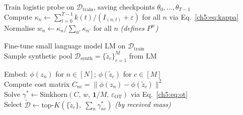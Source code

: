 \begin{algorithm}[ht]

    \caption{Trajectory-Aware Knowledge Estimation (\textbf{TAKE})}
    \label{ch5:alg:take}


    \vspace{-0.5\baselineskip}
    \Comment{\noindent\hrulefill}

    \vspace{0.5\baselineskip}
    Train logistic probe on $\mathcal{D}_\text{train}$, saving checkpoints $\theta_0, \ldots, \theta_{T-1}$ \\
    Compute $\kappa_n \leftarrow \textstyle\sum_{t=0}^{T-1} k(t) / (I_{(n,t)} + \varepsilon)$ for all $n$ \hfill via Eq.~\eqref{ch5:eq:kappa} \\
    Normalise $w_n \leftarrow \kappa_n / \sum_{n'} \kappa_{n'}$ for all $n$ \hfill\textit{(defines $P^w$)}

    \vspace{0.5\baselineskip}
    Fine-tune small language model $\mathrm{LM}$ on $\mathcal{D}_\text{train}$ \\
    Sample synthetic pool $\mathcal{D}_\text{synth} = \{\tilde{z}_c\}_{c=1}^{M}$ from $\mathrm{LM}$

    \vspace{0.5\baselineskip}
    Embed: $\phi(z_n)$ for $n \in [N]$; $\phi(\tilde{z}_c)$ for $c \in [M]$ \\
    Compute cost matrix $C_{nc} = \|\phi(z_n) - \phi(\tilde{z}_c)\|^2$ \\
    Solve $\gamma^* \leftarrow \mathrm{Sinkhorn}(C,\, w,\, \mathbf{1}/M,\, \varepsilon_\text{OT})$ \hfill via Eq.~\eqref{ch5:eq:ot} \\
    Select $\tilde{\mathcal{D}} \leftarrow \mathrm{top}\text{-}K\!\left(\{\tilde{z}_c\},\; \textstyle\sum_n \gamma^*_{nc}\right)$ \hfill\textit{(by received mass)}

    \vspace{0.5\baselineskip}
\end{algorithm}
